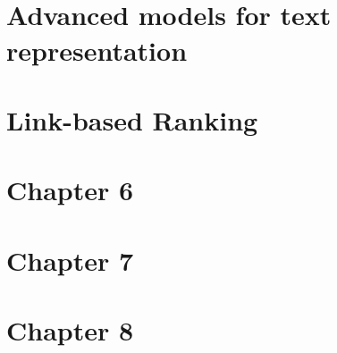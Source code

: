 \documentclass[a4paper]{article}
\title{\vspace{-.25cm} \HWTitle \\ \vspace{.25cm}}
\author{\HWAuthorName}
\begin{document}
\maketitle

\section{Advanced models for text representation} %
\label{sec:chapter_4}
  
\section{Link-based Ranking} %
\label{sec:chapter_5}
  
\section{Chapter 6} %
\label{sec:chapter_6}
  
\section{Chapter 7} %
\label{sec:chapter_7}
  
\section{Chapter 8} %
\label{sec:chapter_8}
  
\end{document}
